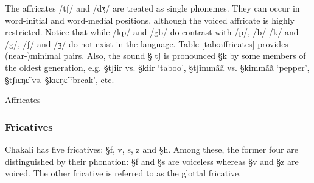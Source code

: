 The affricates {\I /tʃ/} and  {\I /dʒ/} are  treated as single phonemes. They
can occur in word-initial and word-medial positions, although the voiced
affricate is highly restricted. Notice that while  {\I /kp/} and {\I /gb/} do
contrast with {\I /p/}, {\I /b/} {\I /k/} and {\I /g/},   {\I /ʃ/} and  {\I /ʒ/}
do not exist in the language.  Table
\ref{tab:affricates} provides (near-)minimal pairs. Also, the sound {\S
tʃ} is pronounced {\S k} by some members of the oldest generation,
e.g. {\S tʃiir} vs. {\S kiir} `taboo',   {\S tʃimmãã} vs. {\S kimmãã}
`pepper',  {\S tʃɪɛŋɛ̃} vs. {\S kɪɛŋɛ̃} `break', etc.  


\begin{table}[!htb]
\centering
\caption{Affricates\label{tab:affricates}}

\quad
{}


\end{table}



\subsubsection{Fricatives}
\label{sec:approx}

Chakali has five fricatives: {\S f, v, s, z} and {\S h}. Among these, the former
four are distinguished by their phonation: {\S f} and  {\S s} are voiceless
whereas {\S v} and {\S z} are voiced. The other fricative is referred to as the
glottal fricative. 

